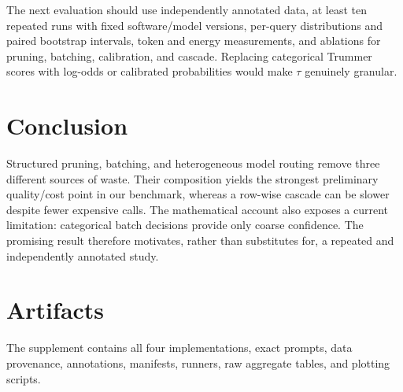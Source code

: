 \documentclass[sigconf,review]{acmart}
\begin{document}
The next evaluation should use independently annotated data, at least ten repeated
runs with fixed software/model versions, per-query distributions and paired
bootstrap intervals, token and energy measurements, and ablations for pruning,
batching, calibration, and cascade. Replacing categorical Trummer scores with
log-odds or calibrated probabilities would make $\tau$ genuinely granular.

\section{Conclusion}
Structured pruning, batching, and heterogeneous model routing remove three
different sources of waste. Their composition yields the strongest preliminary
quality/cost point in our benchmark, whereas a row-wise cascade can be slower
despite fewer expensive calls. The mathematical account also exposes a current
limitation: categorical batch decisions provide only coarse confidence. The
promising result therefore motivates, rather than substitutes for, a repeated
and independently annotated study.

\section{Artifacts}
The supplement contains all four implementations, exact prompts, data provenance,
annotations, manifests, runners, raw aggregate tables, and plotting scripts.

\balance


\end{document}
